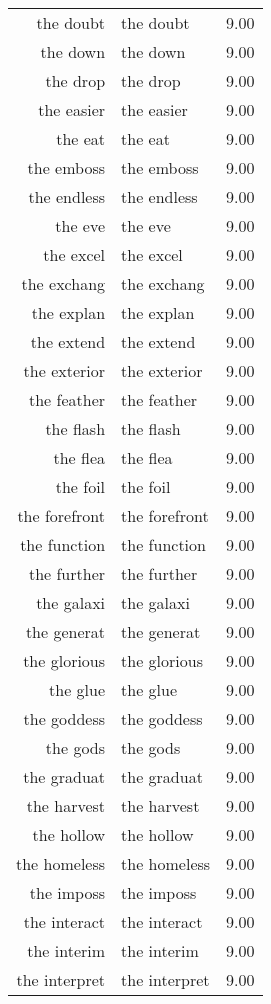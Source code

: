 \begin{table}[ht]
\begin{tabular}{rlr}
  the doubt & the doubt & 9.00 \\ 
  the down & the down & 9.00 \\ 
  the drop & the drop & 9.00 \\ 
  the easier & the easier & 9.00 \\ 
  the eat & the eat & 9.00 \\ 
  the emboss & the emboss & 9.00 \\ 
  the endless & the endless & 9.00 \\ 
  the eve & the eve & 9.00 \\ 
  the excel & the excel & 9.00 \\ 
  the exchang & the exchang & 9.00 \\ 
  the explan & the explan & 9.00 \\ 
  the extend & the extend & 9.00 \\ 
  the exterior & the exterior & 9.00 \\ 
  the feather & the feather & 9.00 \\ 
  the flash & the flash & 9.00 \\ 
  the flea & the flea & 9.00 \\ 
  the foil & the foil & 9.00 \\ 
  the forefront & the forefront & 9.00 \\ 
  the function & the function & 9.00 \\ 
  the further & the further & 9.00 \\ 
  the galaxi & the galaxi & 9.00 \\ 
  the generat & the generat & 9.00 \\ 
  the glorious & the glorious & 9.00 \\ 
  the glue & the glue & 9.00 \\ 
  the goddess & the goddess & 9.00 \\ 
  the gods & the gods & 9.00 \\ 
  the graduat & the graduat & 9.00 \\ 
  the harvest & the harvest & 9.00 \\ 
  the hollow & the hollow & 9.00 \\ 
  the homeless & the homeless & 9.00 \\ 
  the imposs & the imposs & 9.00 \\ 
  the interact & the interact & 9.00 \\ 
  the interim & the interim & 9.00 \\ 
  the interpret & the interpret & 9.00 \\ 

\end{tabular}
\end{table}
